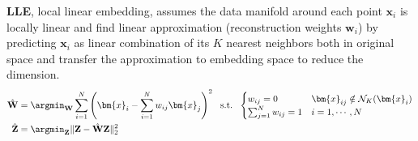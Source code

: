\textbf{LLE}, local linear embedding, assumes the data manifold around each point $\bm{x}_i$ is locally linear and find linear approximation (reconstruction weights $\bm{w}_i$) by predicting $\bm{x}_i$ as linear combination of its $K$ nearest neighbors both in original space and transfer the approximation to embedding space to reduce the dimension. 
\begin{align}
    \hat{\mathbf{W}} & = \argmin_{\mathbf{W}}\sum_{i=1}^N\left(
        \bm{x}_i - \sum_{i=1}^N w_{ij}\bm{x}_j
    \right)^2~~\text{s.t.}~~ \begin{cases}
        w_{ij} = 0 & \bm{x}_{ij}\notin\mathcal{N}_K(\bm{x}_i) \\
        \sum_{j=1}^N w_{ij} = 1 & i=1,\cdots,N
    \end{cases} \\
    \hat{\mathbf{Z}} & = \argmin_{\mathbf{Z}}\|\mathbf{Z}-\hat{\mathbf{W}}\mathbf{Z}\|^2_2
\end{align}



